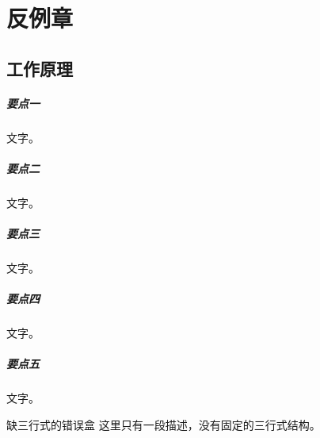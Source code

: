 \chapter{反例章}

\section{工作原理}
\paragraph{要点一} 文字。
\paragraph{要点二} 文字。
\paragraph{要点三} 文字。
\paragraph{要点四} 文字。
\paragraph{要点五} 文字。

\begin{misconception}{缺三行式的错误盒}
这里只有一段描述，没有固定的三行式结构。
\end{misconception}

